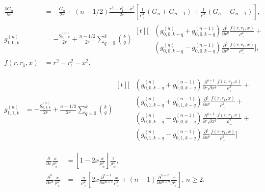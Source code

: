 \documentclass[a4paper,12pt]{article}
\newcommand{\gnijk}[4]{g^{(#1)}_{#2,#3,#4}}
\begin{document}
\begin{align}
  \frac{\partial G_{n}}{\partial r}
  &=
  -\frac{G_{n}}{2r}
  + (n-1/2)\frac{r^{2} - r_{1}^{2} - x^{2}}{2r}
  \left[
    \frac{1}{\rho_{+}^{2}}(G_{n} + G_{n-1})
    +
    \frac{1}{\rho_{-}^{2}}(G_{n} - G_{n-1})
  \right],\\
  \gnijk{n}{1}{0}{k}
  &=
  -\frac{\gnijk{n}{0}{0}{k}}{2r}
  + \frac{n-1/2}{2r}
  \sum_{q=0}^{k}
  \binom{k}{q}
  \begin{aligned}[t]
     \bigg[
    &\left(\gnijk{n}{0}{0}{k-q} + \gnijk{n-1}{0}{0}{k-q}\right)
    \frac{\partial^{q}}{\partial x^{q}}
    \frac{f(r,r_{1},x)}{\rho_{+}^{2}} + \\
    &\left(\gnijk{n}{0}{0}{k-q} - \gnijk{n-1}{0}{0}{k-q}\right)
    \frac{\partial^{q}}{\partial x^{q}}
    \frac{f(r,r_{1},x)}{\rho_{-}^{2}}
    \bigg],
  \end{aligned}\\
  f(r,r_{1},x) &= r^{2} - r_{1}^{2} - x^{2}.
\end{align}

\begin{align}
  \gnijk{n}{1}{1}{k}
  &=
  -\frac{\gnijk{n}{0}{1}{k}}{2r}
  +\frac{n-1/2}{2r}
  \sum_{q=0}^{k}
  \binom{k}{q}
    \begin{aligned}[t]
      \biggl[
      &
      \left(\gnijk{n}{0}{0}{k-q} + \gnijk{n-1}{0}{0}{k-q}\right)
      \frac{\partial^{q+1}}{\partial r_{1}\partial x^{q}}
      \frac{f(r,r_{1},x)}{\rho_{+}^{2}}
      + \\
      &
      \left(\gnijk{n}{0}{1}{k-q} + \gnijk{n-1}{0}{1}{k-q}\right)
      \frac{\partial^{q}}{\partial x^{q}}
      \frac{f(r,r_{1},x)}{\rho_{+}^{2}}
      + \\
      &
      \left(\gnijk{n}{0}{0}{k-q} - \gnijk{n-1}{0}{0}{k-q}\right)
      \frac{\partial^{q+1}}{\partial r_{1}\partial x^{q}}
      \frac{f(r,r_{1},x)}{\rho_{-}^{2}}
      + \\
      &
      \left(\gnijk{n}{0}{1}{k-q} - \gnijk{n-1}{0}{1}{k-q}\right)
      \frac{\partial^{q}}{\partial x^{q}}
      \frac{f(r,r_{1},x)}{\rho_{-}^{2}}
      \biggr]
    \end{aligned}
\end{align}

\begin{align}
  \frac{\partial}{\partial x}
  \frac{x}{\rho_{\pm}^{2}}
  &=
  \left[
    1 - 2x\frac{x}{\rho_{\pm}^{2}}
  \right]
  \frac{1}{\rho_{\pm}^{2}},\\
  \frac{\partial^{n}}{\partial x^{n}}
  \frac{x}{\rho_{\pm}^{2}}
  &=
  -\frac{n}{\rho_{\pm}^{2}}
  \left[
    2x
    \frac{\partial^{n-1}}{\partial x^{n-1}}
    \frac{x}{\rho_{\pm}^{2}}
    +
    (n-1)
    \frac{\partial^{n-2}}{\partial x^{n-2}}
    \frac{x}{\rho_{\pm}^{2}}    
  \right],\,n\geq 2.
\end{align}
\end{document}
